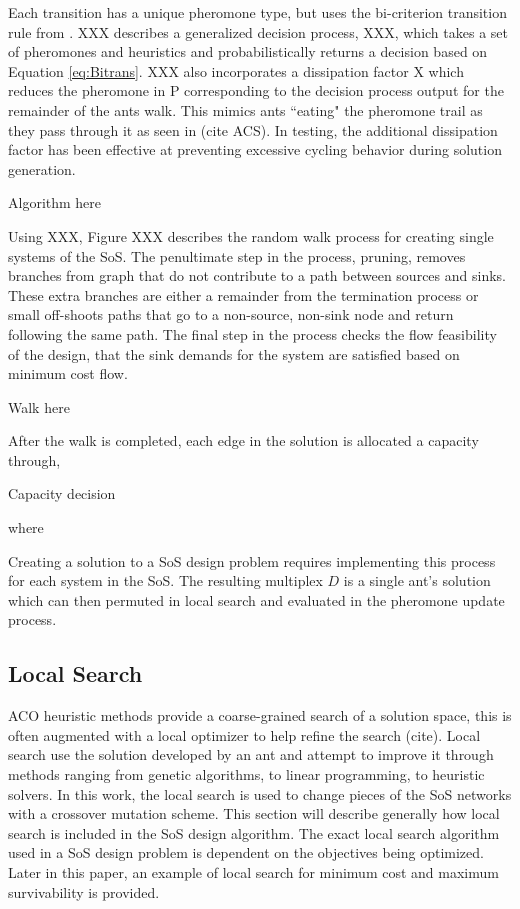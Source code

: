 \documentclass[preprint,12pt]{elsarticle}
\begin{document}
Each transition has a unique pheromone type, but uses the bi-criterion transition rule from \cite{Iredi2001}. XXX describes a generalized decision process, XXX, which takes a set of pheromones and heuristics and probabilistically returns a decision based on Equation \ref{eq:Bitrans}. XXX also incorporates a dissipation factor X which reduces the pheromone in P corresponding to the decision process output for the remainder of the ants walk. This mimics ants ``eating" the pheromone trail as they pass through it as seen in (cite ACS). In testing, the additional dissipation factor has been effective at preventing excessive cycling behavior during solution generation.

Algorithm here

Using XXX, Figure XXX describes the random walk process for creating single systems of the SoS. The penultimate step in the process, pruning, removes branches from graph that do not contribute to a path between sources and sinks. These extra branches are either a remainder from the termination process or small off-shoots paths that go to a non-source, non-sink node and return following the same path. The final step in the process checks the flow feasibility of the design, that the sink demands for the system are satisfied based on minimum cost flow.

Walk here


After the walk is completed, each edge in the solution is allocated a capacity through,

Capacity decision

where 

Creating a solution to a SoS design problem requires implementing this process for each system in the SoS. The resulting multiplex $D$ is a single ant's solution which can then permuted in local search and evaluated in the pheromone update process.


\subsection{Local Search} \label{sec:search}

ACO heuristic methods provide a coarse-grained search of a solution space, this is often augmented with a local optimizer to help refine the search (cite). Local search use the solution developed by an ant and attempt to improve it through methods ranging from genetic algorithms, to linear programming, to heuristic solvers. In this work, the local search is used to change pieces of the SoS networks with a crossover mutation scheme. This section will describe generally how local search is included in the SoS design algorithm. The exact local search algorithm used in a SoS design problem is dependent on the objectives being optimized. Later in this paper, an example of local search for minimum cost and maximum survivability is provided. 
\end{document}
